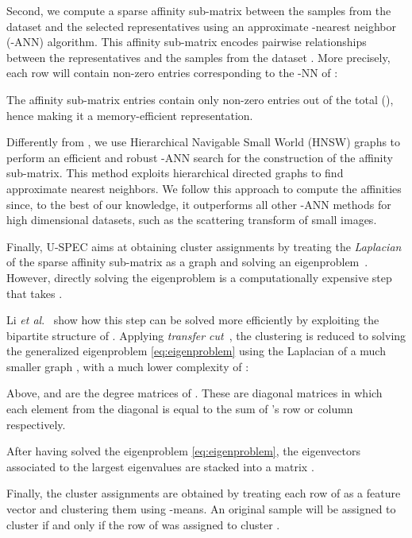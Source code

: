 \documentclass[11pt]{article}
\theoremstyle{definition}
\newcommand{\EtAl}{\textit{et al}}
\begin{document}
Second, we compute a sparse affinity sub-matrix  between the  samples from the dataset and the selected  representatives using an approximate -nearest neighbor (-ANN) algorithm. This affinity sub-matrix  encodes pairwise relationships between the representatives
 and the samples from the dataset 
.
More precisely, each row  will contain  non-zero entries corresponding to the -NN of :


The affinity sub-matrix entries contain only  non-zero entries out of the total  (), hence making it a memory-efficient representation.

Differently from \cite{Huang_UltraScalableSpectralClustering_2019}, we use Hierarchical Navigable Small World (HNSW) graphs \cite{Malkov_HNSWG_2018} to perform an efficient and robust -ANN search for the construction of the affinity sub-matrix. This method exploits hierarchical directed graphs to find approximate nearest neighbors. We follow this approach to compute the affinities since, to the best of our knowledge, it outperforms all other -ANN methods for high dimensional datasets, such as the scattering transform of small images.



Finally, U-SPEC aims at obtaining cluster assignments by treating the \emph{Laplacian} of the sparse affinity sub-matrix  as a graph and solving an eigenproblem~\cite{Luxburg_SpectralClusteringTutorial_2007}. However, directly solving the eigenproblem is a computationally expensive step that takes . 


Li \EtAl.~\cite{Li_SegmentationUsingSuperpixelsTransferCut_2012} show how this step can be solved more efficiently by exploiting the bipartite structure of . Applying \emph{transfer cut}~\cite{Li_SegmentationUsingSuperpixelsTransferCut_2012}, the clustering is reduced to solving the generalized eigenproblem \eqref{eq:eigenproblem} using the Laplacian  of a much smaller graph , with a much lower complexity of :

\vspace{-0.2cm}


Above,  and  are the degree matrices of . These are diagonal matrices in which each element  from the diagonal is equal to the sum of 's  row or column respectively. 

After having solved the eigenproblem \eqref{eq:eigenproblem}, the eigenvectors associated to the  largest eigenvalues are stacked into a matrix .

Finally, the cluster assignments are obtained by treating each row of  as a feature vector and clustering them using -means. An original sample  will be assigned to cluster  if and only if the  row of  was assigned to cluster .
\end{document}
